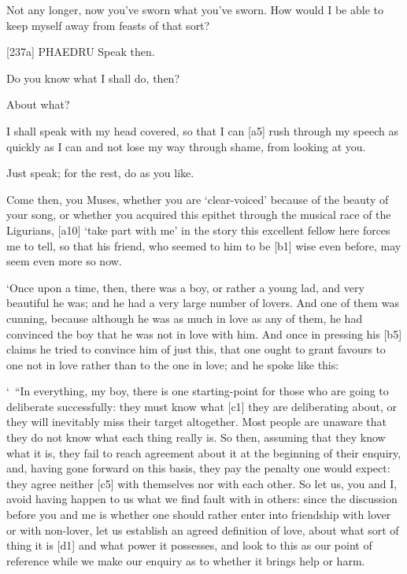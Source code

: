 Not any longer, now you've sworn what you've sworn. How would I
be able to keep myself away from feasts of that sort?

{[}237a{]} PHAEDRU Speak then.

 Do you know what I shall do, then?

 About what?

 I shall speak with my head covered, so that I can {[}a5{]} rush
through my speech as quickly as I can and not lose my way through shame,
from looking at you.

 Just speak; for the rest, do as you like.

 Come then, you Muses, whether you are ‘clear-voiced' because of
the beauty of your song, or whether you acquired this epithet through
the musical race of the
Ligurians, {[}a10{]}
‘take part with me' in
the story this excellent fellow here forces me to tell, so that his
friend, who seemed to him
to be {[}b1{]} wise even before, may seem even more so now.

‘Once upon a time, then, there was a boy, or rather a young lad, and
very beautiful he was; and he had a very large number of lovers. And one
of them was cunning, because although he was as much in love as any of
them, he had convinced the boy that he was not in love with him. And
once in pressing his {[}b5{]} claims he tried to convince him of just
this, that one ought to grant favours to one not in love rather than to
the one in love; and he spoke like this:

‘~“In everything, my boy, there is one starting-point for those who are
going to deliberate successfully: they must know what {[}c1{]} they are
deliberating about, or they will inevitably miss their target
altogether. Most people are unaware that they do not know what each
thing really is. So then,
assuming that they know what it is, they fail to reach agreement about
it at the beginning of their enquiry, and, having gone forward on this
basis, they pay the penalty one would expect: they agree neither
{[}c5{]} with themselves nor with each other. So let us, you and I,
avoid having happen to us what we find fault with in others: since the
discussion before you and me is whether one should rather enter into
friendship with lover or with non-lover, let us establish an agreed
definition of love, about what sort of thing it is {[}d1{]} and what
power it possesses, and look to this as our point of reference while we
make our enquiry as to whether it brings help or harm.

